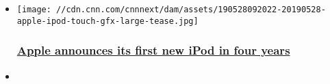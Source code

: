 \begin{itemize}
\item
  \href{/2019/05/28/tech/apple-ipod-touch-new/index.html}{}

  \texttt{[image: //cdn.cnn.com/cnnnext/dam/assets/190528092022-20190528-apple-ipod-touch-gfx-large-tease.jpg]}

  \hypertarget{apple-announces-its-first-new-ipod-in-four-years}{%
  \subsubsection{\texorpdfstring{\href{/2019/05/28/tech/apple-ipod-touch-new/index.html}{Apple
  announces its first new iPod in four
  years}}{Apple announces its first new iPod in four years}}\label{apple-announces-its-first-new-ipod-in-four-years}}
\item
\end{itemize}

